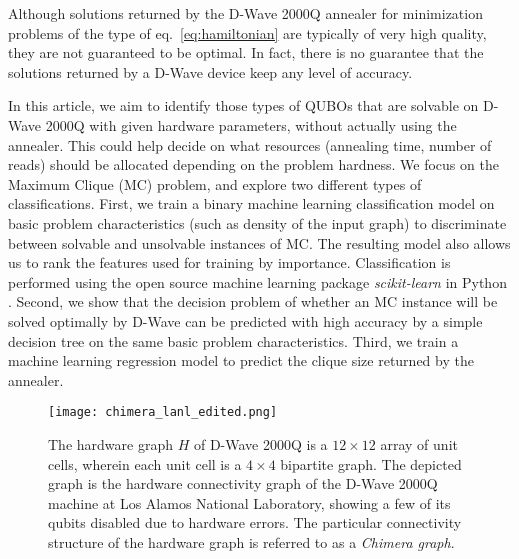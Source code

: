 \documentclass[a4paper,11pt]{article}
\begin{document}
Although solutions returned by the D-Wave 2000Q annealer for minimization problems of the type of eq.~\eqref{eq:hamiltonian} are typically of very high quality, they are not guaranteed to be optimal. In fact, there is no guarantee that the solutions returned by a D-Wave device keep any level of accuracy.

In this article, we aim to identify those types of QUBOs that are solvable on D-Wave 2000Q with given hardware parameters, without actually using the annealer. This could help decide on what resources (annealing time, number of reads) should be allocated depending on the problem hardness. We focus on the Maximum Clique (MC) problem, and explore two different types of classifications. First, we train a binary machine learning classification model on basic problem characteristics (such as density of the input graph) to discriminate between solvable and unsolvable instances of MC. The resulting model also allows us to rank the features used for training by importance. Classification is performed using the open source machine learning package \textit{scikit-learn} in Python \cite{scikit-learn}. Second, we show that the decision problem of whether an MC instance will be solved optimally by D-Wave can be predicted with high accuracy by a simple decision tree on the same basic problem characteristics. Third, we train a machine learning regression model to predict the clique size returned by the annealer.

\begin{figure}[t]
\centering
    \texttt{[image: chimera\_lanl\_edited.png]}
    \caption{The hardware graph $H$ of  D-Wave 2000Q is a $12 \times 12$ array of unit cells, wherein each unit cell is a $4 \times 4$ bipartite graph. The depicted graph is the hardware connectivity graph of the D-Wave 2000Q machine at Los Alamos National Laboratory, showing a few of its qubits disabled due to hardware errors. The particular connectivity structure of the hardware graph is referred to as a \textit{Chimera graph}.\label{fig:chimera}}
\end{figure}
\end{document}
